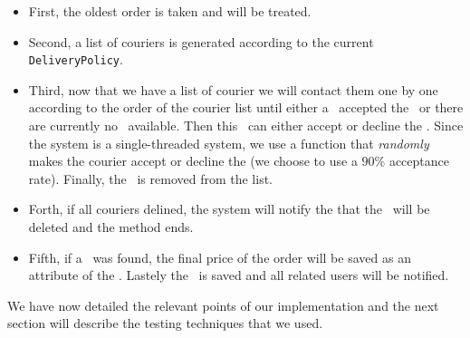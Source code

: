 \begin{itemize}
	\item First, the oldest order is taken and will be treated. 
	\item Second, a list of couriers is generated according to the current \lstinline|DeliveryPolicy|.
	\item Third, now that we have a list of courier we will contact them one by one
	according to the order of the courier list until either a \Courier~accepted
	the \Order~or there are currently no \Courier~available. Then this \Courier~can either accept
	or decline the \Order. Since the system is a single-threaded system, we use a
	function that \emph{randomly} makes the courier accept or decline the \Order
  (we choose to use a $90\%$ acceptance rate). Finally, the \Courier~is removed from the list.
	\item Forth, if all couriers delined, the system will notify the \Customer
  that the \Order~will be deleted and the method ends.
	\item Fifth, if a \Courier~was found, the final price of the order will be saved
	as an attribute of the \Order. Lastely the \Order~is saved and all related
	users will be notified.	
\end{itemize}


We have now detailed the relevant points of our implementation and the next section
will describe the testing techniques that we used.

